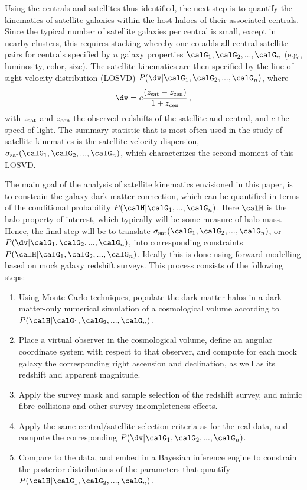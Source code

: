 \documentclass[fleqn,usenatbib,useAMS]{mnras}
\begin{document}
	Using the centrals and satellites thus identified, the next step is to quantify the kinematics of satellite galaxies within the host haloes of their associated centrals. Since the typical number of satellite galaxies per central is small, except in nearby clusters, this requires stacking whereby one co-adds all central-satellite pairs for centrals specified by $n$ galaxy properties ${\calG_1,\calG_2,...,\calG_n}$ (e.g., luminosity, color, size). The satellite kinematics are then specified by the line-of-sight velocity distribution (LOSVD) $P(\dv |\calG_1, \calG_2,...,\calG_n)$, where 
	\begin{equation}\label{eq:dv}
	\dv = c \frac{(z_{\rm sat} - z_{\rm cen})}{1+z_{\rm cen}}\,,
	\end{equation}
	with $z_{\rm sat}$ and $z_{\rm cen}$ the observed redshifts of the satellite and central, and $c$ the speed of light. The summary statistic that is most often used in the study of satellite kinematics is the satellite velocity dispersion, $\sigma_{\rm sat}(\calG_1, \calG_2,...,\calG_n)$,  which characterizes the second moment of this LOSVD.
	
	The main goal of the analysis of satellite kinematics envisioned in this paper, is to constrain the galaxy-dark matter connection, which can be quantified in terms of the conditional probability $P(\calH | \calG_1, ..., \calG_n)$. Here $\calH$ is the halo property of interest, which typically will be some measure of halo mass. Hence, the final step will be to translate $\sigma_{\rm sat}(\calG_1, \calG_2,...,\calG_n)$,  or $P(\dv |\calG_1, \calG_2,...,\calG_n)$, into corresponding constraints $P(\calH | \calG_1, \calG_2,...,\calG_n)$. Ideally this is done using forward modelling based on mock galaxy redshift surveys. This process consists of the following steps:
	\begin{enumerate}
		\item Using Monte Carlo techniques, populate the dark matter halos in a dark-matter-only numerical simulation of a cosmological volume according to $P(\calH | \calG_1, \calG_2,...,\calG_n)$. 
		\item Place a virtual observer in the cosmological volume, define an angular coordinate system with respect to that observer, and compute for each mock galaxy the corresponding right ascension and declination, as well as its redshift and apparent magnitude.
		\item Apply the survey mask and sample selection of the redshift survey, and mimic fibre collisions and other survey incompleteness effects. 
		\item Apply the same central/satellite selection criteria as for the real data, and compute the corresponding $P(\dv |\calG_1, \calG_2,...,\calG_n)$. 
		\item Compare to the data, and embed in a Bayesian inference engine to constrain the posterior distributions of the parameters that quantify $P(\calH | \calG_1, \calG_2,...,\calG_n)$. 
	\end{enumerate}
	
\end{document}
